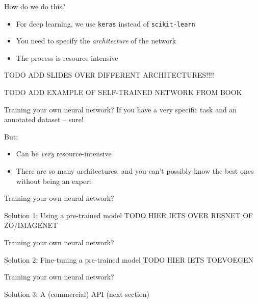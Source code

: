 
\begin{frame}{How do we do this?}
  \begin{itemize}
  \item For deep learning, we use \texttt{keras} instead of \texttt{scikit-learn}
  \item You need to specify the \emph{architecture} of the network
  \item The process is resource-intensive
  \end{itemize}
\end{frame}


TODO ADD SLIDES OVER DIFFERENT ARCHITECTURES!!!!

TODO ADD EXAMPLE OF SELF-TRAINED NETWORK FROM BOOK

\begin{frame}{Training your own neural network?}
  If you have a very specific task and an annotated dataset -- sure!

  But:
  \begin{itemize}
  \item Can be \emph{very} resource-intensive
  \item There are so many architectures, and you can't possibly know the best ones without being an expert
  \end{itemize}
\end{frame}


\begin{frame}{Training your own neural network?}
  \begin{block}{Solution 1: Using a pre-trained model}
    TODO HIER IETS OVER RESNET OF ZO/IMAGENET
  \end{block}
\end{frame}

\begin{frame}{Training your own neural network?}
  \begin{block}{Solution 2: Fine-tuning a pre-trained model}
    TODO HIER IETS TOEVOEGEN
  \end{block}
\end{frame}


\begin{frame}{Training your own neural network?}
  \begin{block}{Solution 3: A (commercial) API}
    (next section)
  \end{block}
\end{frame}



